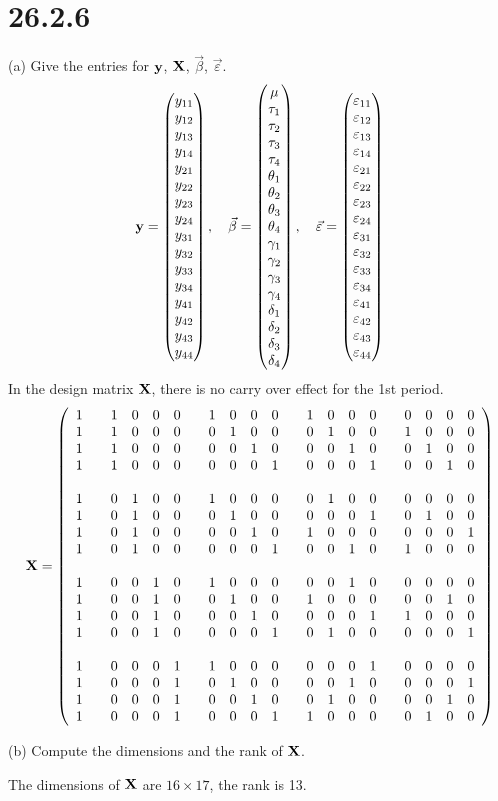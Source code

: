 \section*{26.2.6}
(a) Give the entries for $\bf y$, $\bf X$, $\vec\beta$, $\vec\varepsilon$.
$${\bf y}=\left(\begin{matrix}
y_{11}\cr
y_{12}\cr
y_{13}\cr
y_{14}\cr
y_{21}\cr
y_{22}\cr
y_{23}\cr
y_{24}\cr
y_{31}\cr
y_{32}\cr
y_{33}\cr
y_{34}\cr
y_{41}\cr
y_{42}\cr
y_{43}\cr
y_{44}
\end{matrix}\right),\quad\vec\beta=\left(\begin{matrix}
\mu\cr
\tau_1\cr
\tau_2\cr
\tau_3\cr
\tau_4\cr
\theta_1\cr
\theta_2\cr
\theta_3\cr
\theta_4\cr
\gamma_1\cr
\gamma_2\cr
\gamma_3\cr
\gamma_4\cr
\delta_1\cr
\delta_2\cr
\delta_3\cr
\delta_4
\end{matrix}\right),\quad\vec\varepsilon=\left(\begin{matrix}
\varepsilon_{11}\cr
\varepsilon_{12}\cr
\varepsilon_{13}\cr
\varepsilon_{14}\cr
\varepsilon_{21}\cr
\varepsilon_{22}\cr
\varepsilon_{23}\cr
\varepsilon_{24}\cr
\varepsilon_{31}\cr
\varepsilon_{32}\cr
\varepsilon_{33}\cr
\varepsilon_{34}\cr
\varepsilon_{41}\cr
\varepsilon_{42}\cr
\varepsilon_{43}\cr
\varepsilon_{44}
\end{matrix}\right)
$$
In the design matrix $\bf X$, there is no carry over effect for the 1st period.
$${\bf X}=\left(\begin{array}{ccccccccccccccccccccc}
1 && 1 & 0 & 0 & 0 && 1 & 0 & 0 & 0 && 1 & 0 & 0 & 0 && 0 & 0 & 0 & 0\cr
1 && 1 & 0 & 0 & 0 && 0 & 1 & 0 & 0 && 0 & 1 & 0 & 0 && 1 & 0 & 0 & 0\cr
1 && 1 & 0 & 0 & 0 && 0 & 0 & 1 & 0 && 0 & 0 & 1 & 0 && 0 & 1 & 0 & 0\cr
1 && 1 & 0 & 0 & 0 && 0 & 0 & 0 & 1 && 0 & 0 & 0 & 1 && 0 & 0 & 1 & 0\cr
\cr
1 && 0 & 1 & 0 & 0 && 1 & 0 & 0 & 0 && 0 & 1 & 0 & 0 && 0 & 0 & 0 & 0\cr
1 && 0 & 1 & 0 & 0 && 0 & 1 & 0 & 0 && 0 & 0 & 0 & 1 && 0 & 1 & 0 & 0\cr
1 && 0 & 1 & 0 & 0 && 0 & 0 & 1 & 0 && 1 & 0 & 0 & 0 && 0 & 0 & 0 & 1\cr
1 && 0 & 1 & 0 & 0 && 0 & 0 & 0 & 1 && 0 & 0 & 1 & 0 && 1 & 0 & 0 & 0\cr
\cr
1 && 0 & 0 & 1 & 0 && 1 & 0 & 0 & 0 && 0 & 0 & 1 & 0 && 0 & 0 & 0 & 0\cr
1 && 0 & 0 & 1 & 0 && 0 & 1 & 0 & 0 && 1 & 0 & 0 & 0 && 0 & 0 & 1 & 0\cr
1 && 0 & 0 & 1 & 0 && 0 & 0 & 1 & 0 && 0 & 0 & 0 & 1 && 1 & 0 & 0 & 0\cr
1 && 0 & 0 & 1 & 0 && 0 & 0 & 0 & 1 && 0 & 1 & 0 & 0 && 0 & 0 & 0 & 1\cr
\cr
1 && 0 & 0 & 0 & 1 && 1 & 0 & 0 & 0 && 0 & 0 & 0 & 1 && 0 & 0 & 0 & 0\cr
1 && 0 & 0 & 0 & 1 && 0 & 1 & 0 & 0 && 0 & 0 & 1 & 0 && 0 & 0 & 0 & 1\cr
1 && 0 & 0 & 0 & 1 && 0 & 0 & 1 & 0 && 0 & 1 & 0 & 0 && 0 & 0 & 1 & 0\cr
1 && 0 & 0 & 0 & 1 && 0 & 0 & 0 & 1 && 1 & 0 & 0 & 0 && 0 & 1 & 0 & 0\cr
\end{array}\right)
$$

\bigskip
\noindent
(b) Compute the dimensions and the rank of $\bf X$.

\bigskip
\noindent
The dimensions of $\bf X$ are $16\times 17$, the rank is 13.
